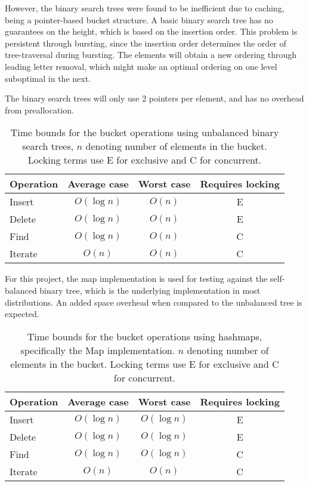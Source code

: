 However, the binary search trees were found to be inefficient due to
caching\cite{Nash:2008}, being a pointer-based bucket structure. A basic binary
search tree has no guarantees on the height, which is based on the insertion
order. This problem is persistent through bursting, since the insertion order
determines the order of tree-traversal during bursting. The elements will obtain
a new ordering through leading letter removal, which might make an optimal ordering
on one level suboptimal in the next.

The binary search trees will only use 2 pointers per element, and
has no overhead from preallocation. 

\begin{table}[h!]
    \centering
    \begin{tabular}[here]{ l || c | c | c}
        Operation & Average case & Worst case & Requires locking  \\ \hline
        Insert    & $O(\log n)$ & $O(n)$ & E \\ \hline
        Delete    & $O(\log n)$ & $O(n)$ & E \\ \hline
        Find      & $O(\log n)$ & $O(n)$ & C \\ \hline
        Iterate   & $O(n)$      & $O(n)$ & C \\ \hline
    \end{tabular}
    \caption{Time bounds for the bucket operations using unbalanced binary
    search trees, $n$ denoting number of elements in the bucket. Locking terms
    use E for exclusive and C for concurrent.}
    \label{tab:bounds:bst}
\end{table}


For this project, the \STL map implementation is used for testing against the
self-balanced binary tree, which is the underlying implementation in most
distributions. An added space overhead when compared to the unbalanced tree is
expected.

\begin{table}[h!]
    \centering
    \begin{tabular}[here]{ l || c | c | c}
        Operation & Average case & Worst case & Requires locking  \\ \hline
        Insert    & $O(\log n)$  & $O(\log n)$ & E \\ \hline
        Delete    & $O(\log n)$  & $O(\log n)$ & E \\ \hline
        Find      & $O(\log n)$  & $O(\log n)$ & C \\ \hline
        Iterate   & $O(n)$       & $O(n)$      & C \\ \hline
    \end{tabular}
    \caption{Time bounds for the bucket operations using hashmaps, specifically
    the \STL Map implementation. $n$ denoting number of elements in the
    bucket. Locking terms use E for exclusive and C for concurrent.}

    \label{tab:bounds:map}
\end{table}

